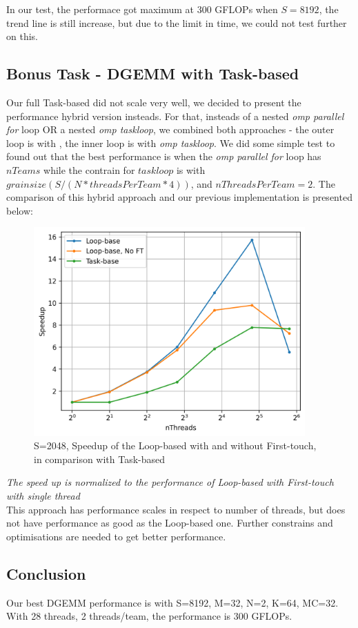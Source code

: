 \documentclass[article]{scrartcl}
\begin{document}
In our test, the performace got maximum at 300 GFLOPs when $S = 8192$, the trend line is still increase, but due to the limit in time, we could not test further on this.

\subsection{Bonus Task - DGEMM with Task-based}
Our full Task-based did not scale very well, we decided to present the performance hybrid version insteads. For that, insteads of a nested \textit{omp parallel for} loop OR a nested \textit{omp taskloop}, we combined both approaches - the outer loop is with , the inner loop is with \textit{omp taskloop}. We did some simple test to found out that the best performance is when the \textit{omp parallel for} loop has $nTeams$ while the contrain for $taskloop$ is with $grainsize(S/(N*threadsPerTeam*4))$, and $nThreadsPerTeam=2$. The comparison of this hybrid approach and our previous implementation is presented below: 

\begin{figure}[htpb]
    \centering
    \includegraphics[width=\textwidth,height=8cm,keepaspectratio=true]{../figs/4.CompareTask.png}
    \caption{S=2048, Speedup of the Loop-based with and without First-touch, in comparison with Task-based}
    \label{fig:dgemm3}
\end{figure}
\textit{The speed up is normalized to the performance of Loop-based with First-touch with single thread} \\

This approach has performance scales in respect to number of threads, but does not have performance as good as the Loop-based one. Further constrains and optimisations are needed to get better performance.

\subsection{Conclusion}
Our best DGEMM performance is with S=8192, M=32, N=2, K=64, MC=32. With 28 threads, 2 threads/team, the performance is 300 GFLOPs.  
\medskip
{}

\end{document}
